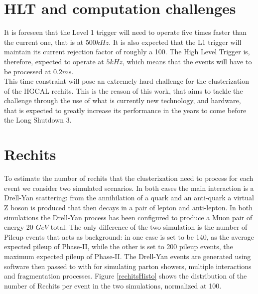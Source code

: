 \section{HLT and computation challenges}
It is foreseen that the Level 1 trigger will need to operate five times faster than the current one, that is at $500 \unit{kHz}$. It is also expected that the L1 trigger will maintain its current rejection factor of roughly a 100. The High Level Trigger is, therefore, expected to operate at $5 \unit{kHz}$, which means that the events will have to be processed at $0.2 \unit{ms}$.\\
This time constraint will pose an extremely hard challenge for the clusterization of the HGCAL rechits. This is the reason of this work, that aims to tackle the challenge through the use of what is currently new technology, and hardware, that is expected to greatly increase its performance in the years to come before the Long Shutdown 3.

\section{Rechits}
To estimate the number of rechits that the clusterization need to process for each event we consider two simulated scenarios.
In both cases the main interaction is a Drell-Yan scattering: from the annihilation of a quark and an anti-quark a virtual Z boson is produced that then decays in a pair of lepton and anti-lepton. 
In both simulations the Drell-Yan process has been configured to produce a Muon pair of energy 20 $\unit{GeV}$ total. The only difference of the two simulation is the number of Pileup events that acts as background: in one case is set to be 140, as the average expected pileup of Phase-II, while the other is set to 200 pileup events, the maximum expected pileup of Phase-II.
The Drell-Yan events are generated using  software then passed to  with  for simulating parton showers, multiple interactions and fragmentation processes. Figure \ref{rechitsHisto} shows the distribution of the number of Rechits per event in the two simulations, normalized at 100.
\clearpage

